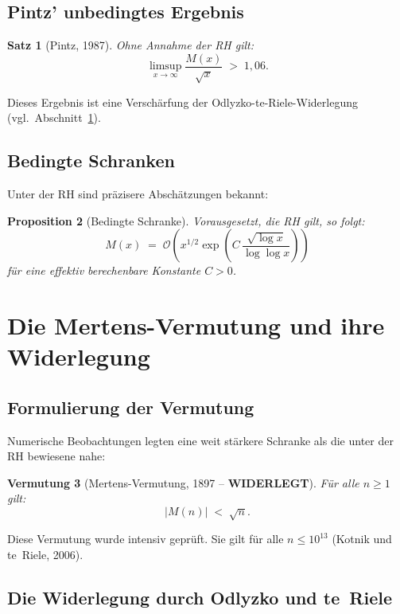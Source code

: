 \documentclass[12pt,a4paper]{amsart}
\newtheorem{theorem}{Satz}[section]
\newtheorem{proposition}[theorem]{Proposition}
\newtheorem{vermutung}[theorem]{Vermutung}
\theoremstyle{definition}
\newcommand{\BigO}{\mathcal{O}}
\begin{document}
\subsection{Pintz' unbedingtes Ergebnis}

\begin{theorem}[Pintz, 1987]
\label{satz:pintz}
Ohne Annahme der RH gilt:
\[
  \limsup_{x \to \infty} \frac{M(x)}{\sqrt{x}} \;>\; 1{,}06.
\]
\end{theorem}

Dieses Ergebnis ist eine Verschärfung der Odlyzko-te-Riele-Widerlegung
(vgl.\ Abschnitt~\ref{sec:mertens-vermutung}).

\subsection{Bedingte Schranken}

Unter der RH sind präzisere Abschätzungen bekannt:

\begin{proposition}[Bedingte Schranke]
\label{prop:bedingt}
Vorausgesetzt, die RH gilt, so folgt:
\[
  M(x) \;=\; \BigO\!\left(x^{1/2}\exp\!\left(C\,\frac{\sqrt{\log x}}{\log\log x}\right)\right)
\]
für eine effektiv berechenbare Konstante $C > 0$.
\end{proposition}

\section{Die Mertens-Vermutung und ihre Widerlegung}
\label{sec:mertens-vermutung}

\subsection{Formulierung der Vermutung}

Numerische Beobachtungen legten eine weit stärkere Schranke als die unter der
RH bewiesene nahe:

\begin{vermutung}[Mertens-Vermutung, 1897 -- \textbf{WIDERLEGT}]
\label{verm:mertens}
Für alle $n \ge 1$ gilt:
\[
  |M(n)| \;<\; \sqrt{n}.
\]
\end{vermutung}

Diese Vermutung wurde intensiv geprüft.  Sie gilt für alle $n \le 10^{13}$
(Kotnik und te~Riele, 2006).

\subsection{Die Widerlegung durch Odlyzko und te~Riele}
\end{document}
